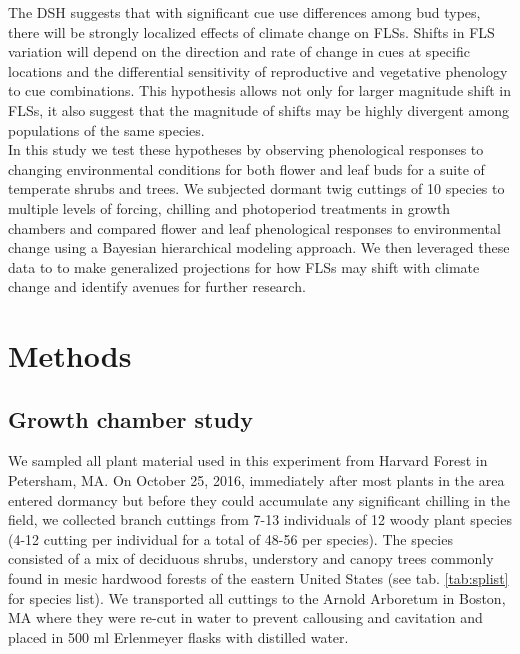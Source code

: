 \documentclass[11pt]{article}
\begin{document}
\noindent The DSH suggests that with significant cue use differences among bud types, there will be strongly localized effects of climate change on FLSs. Shifts in FLS variation will depend on the direction and rate of change in cues at specific locations and the differential sensitivity of reproductive and vegetative phenology to cue combinations. This hypothesis allows not only for larger magnitude shift in FLSs, it also suggest that the magnitude of shifts may be highly divergent among populations of the same species.\\


\noindent In this study we test these hypotheses by observing phenological responses to changing environmental conditions for both flower and leaf buds for a suite of temperate shrubs and trees. We subjected dormant twig cuttings of 10 species to multiple levels of forcing, chilling and photoperiod treatments in growth chambers and compared flower and leaf phenological responses to environmental change using a Bayesian hierarchical modeling approach. We then leveraged these data to to make generalized projections for how FLSs may shift with climate change and identify avenues for further research.\\ 

\section*{Methods}

\subsection*{Growth chamber study}
\noindent We sampled all plant material used in this experiment from Harvard Forest in Petersham, MA. On October 25, 2016, immediately after most plants in the area entered dormancy but before they could accumulate any significant chilling in the field,  we collected branch cuttings from 7-13 individuals of 12 woody plant species (4-12 cutting per individual for a total of 48-56 per species). The species consisted of a mix of deciduous shrubs, understory and canopy trees commonly found in mesic hardwood forests of the eastern United States (see tab. \ref{tab:splist} for species list). We transported all cuttings to the Arnold Arboretum in Boston, MA where they were re-cut in water to prevent callousing and cavitation and placed in 500 ml Erlenmeyer flasks with distilled water.\\ 
\end{document}
